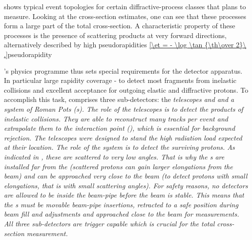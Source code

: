  shows typical event topologies for certain diffractive-process classes that  plans to measure. Looking at the cross-section estimates, one can see that these processes form a large part of the total cross-section. A characteristic property of these processes is the presence of scattering products at very forward directions, alternatively described by high pseudorapidities
\eqref{\et = - \log \tan {\th\over 2}\ .}{pseudorapidity}



's physics programme thus sets special requirements for the detector apparatus. In particular large rapidity coverage - to detect most fragments from inelastic collisions and excellent acceptance for outgoing elastic and diffractive protons. To accomplish this task,  comprises three sub-detectors: the \em{telescopes  and } and a system of \em{Roman Pots} (s). The role of the telescopes is to detect the products of inelastic collisions. They are able to reconstruct many tracks per event and extrapolate them to the interaction point (), which is essential for background rejection. The telescopes were designed to stand the high radiation load expected at their location. The role of the  system is to detect the surviving protons. As indicated in , these are scattered to very low angles. That is why the s are installed far from the  (scattered protons can gain larger elongations from the beam) and can be approached very close to the beam (to detect protons with small elongations, that is with small scattering angles). For safety reasons, no detectors are allowed to be inside the beam-pipe before the beam is stable. This means that the s must be movable beam-pipe insertions, retracted to a safe position during beam fill and adjustments and approached close to the beam for measurements. All three sub-detectors are trigger capable which is crucial for the total cross-section measurement.



